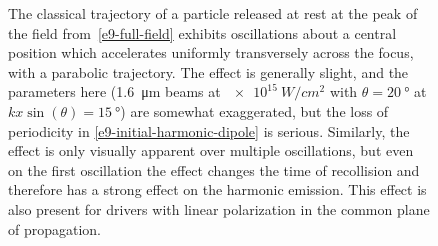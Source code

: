\begin{figure}[htb]
  \hspace{5mm}
  
  \captionsetup{width=\textwidth}
  \caption[
  Classical trajectory of a particle released at the peak of the field in two noncollinear bicircular fields, showing transverse acceleration across the focus
  ]{
  The classical trajectory of a particle released at rest at the peak of the field from~\eqref{e9-full-field} exhibits oscillations about a central position which accelerates uniformly transversely across the focus, with a parabolic trajectory. The effect is generally slight, and the parameters here (\SI{1.6}{\micro\meter} beams at $\SI{e15}{W/cm^2}$ with $\theta=\SI{20}{\degree}$ at $kx\sin(\theta)=\SI{15}{\degree}$) are somewhat exaggerated, but the loss of periodicity in \eqref{e9-initial-harmonic-dipole} is serious. Similarly, the effect is only visually apparent over multiple oscillations, but even on the first oscillation the effect changes the time of recollision and therefore has a strong effect on the harmonic emission. This effect is also present for drivers with linear polarization in the common plane of propagation.
  }
\label{f9-trajectory}
\end{figure}


